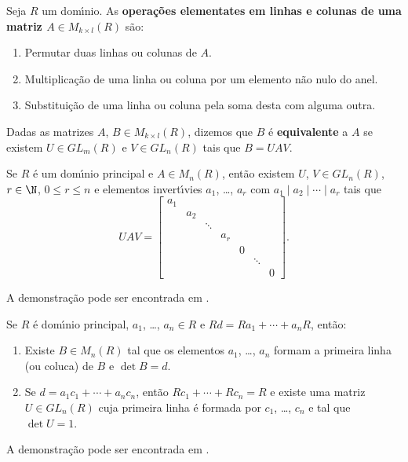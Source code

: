 \begin{definicao}
	Seja $R$ um dom{\'\i}nio. As \textbf{opera\c{c}\~oes elementates em linhas e colunas de uma matriz $A \in M_{k\times l}(R)$} s\~ao:
	\begin{enumerate}
		\item Permutar duas linhas ou colunas de $A$.
		\item Multiplica\c{c}\~ao de uma linha ou coluna por um elemento n\~ao nulo do anel.
		\item Substitui\c{c}\~ao de uma linha ou coluna pela soma desta com alguma outra.
	\end{enumerate}
\end{definicao}

\begin{definicao}
	Dadas as matrizes $A$, $B \in M_{k\times l}(R)$, dizemos que $B$ \'e \textbf{equivalente} a $A$ se existem $U \in GL_m(R)$ e $V \in GL_n(R)$ tais que $B = UAV$.
\end{definicao}

\begin{proposicao}
	Se $R$ \'e um dom{\'\i}nio principal e $A \in M_n(R)$, ent\~ao existem $U$, $V \in GL_n(R)$, $r \in \N$, $0 \le r \le n$ e elementos invert{\'\i}vies $a_1$, \dots, $a_r$ com $a_1 \mid a_2 \mid \cdots \mid a_r$ tais que
	\[
		UAV = \begin{bmatrix}
			a_1\\
			& a_2\\
			& & \ddots\\
			& & & a_r\\
			& & & & 0\\
			& & & & & \ddots\\
			& & & & & & 0
		\end{bmatrix}.
	\]
\end{proposicao}
\begin{prova}
	A demonstra\c{c}\~ao pode ser encontrada em \cite{newman}.
\end{prova}

\begin{lema}
	Se $R$ \'e dom{\'\i}nio principal, $a_1$, \dots, $a_n \in R$ e $Rd = Ra_1 + \cdots + a_nR$, ent\~ao:
	\begin{enumerate}
		\item Existe $B \in M_n(R)$ tal que os elementos $a_1$, \dots, $a_n$ formam a primeira linha (ou coluca) de $B$ e $\det B = d$.
		\item Se $d = a_1c_1 + \cdots + a_nc_n$, ent\~ao $Rc_1 + \cdots + Rc_n = R$ e existe uma matriz $U \in GL_n(R)$ cuja primeira linha \'e formada por $c_1$, \dots, $c_n$ e tal que $\det U = 1$.
	\end{enumerate}
\end{lema}
\begin{prova}
	A demonstra\c{c}\~ao pode ser encontrada em \cite{newman}.
\end{prova}
